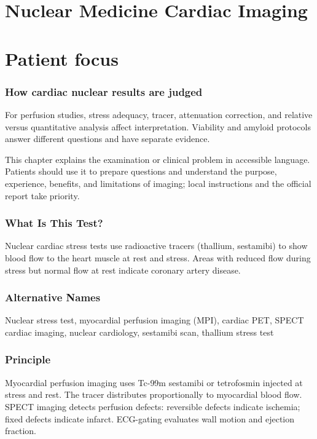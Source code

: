 \section{Nuclear Medicine Cardiac Imaging}


\section*{Patient focus}

\subsubsection*{How cardiac nuclear results are judged}
For perfusion studies, stress adequacy, tracer, attenuation correction, and relative versus quantitative analysis affect interpretation. Viability and amyloid protocols answer different questions and have separate evidence.


This chapter explains the examination or clinical problem in accessible language. Patients should use it to prepare questions and understand the purpose, experience, benefits, and limitations of imaging; local instructions and the official report take priority.


\subsubsection*{What Is This Test?}
Nuclear cardiac stress tests use radioactive tracers (thallium, sestamibi) to show blood flow to the heart muscle at rest and stress. Areas with reduced flow during stress but normal flow at rest indicate coronary artery disease.

\subsubsection*{Alternative Names}
Nuclear stress test, myocardial perfusion imaging (MPI), cardiac PET, SPECT cardiac imaging, nuclear cardiology, sestamibi scan, thallium stress test


\subsubsection*{Principle}
Myocardial perfusion imaging uses Tc-99m sestamibi or tetrofosmin injected at stress and rest. The tracer distributes proportionally to myocardial blood flow. SPECT imaging detects perfusion defects: reversible defects indicate ischemia; fixed defects indicate infarct. ECG-gating evaluates wall motion and ejection fraction.

